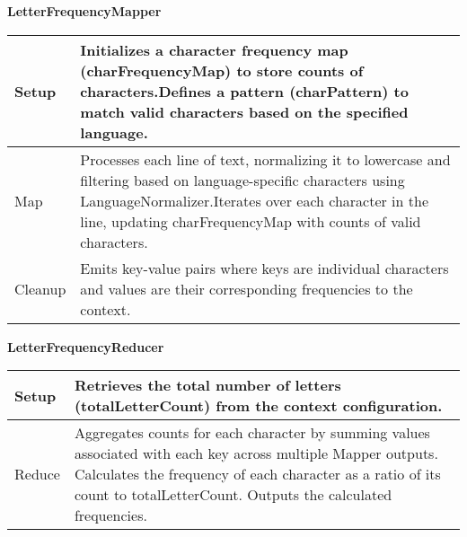 \textbf{LetterFrequencyMapper}
\begin{longtable}{|>{\raggedright\arraybackslash}p{}|>{\raggedright\arraybackslash}p{}|}
    \hline
    Setup & Initializes a character frequency map (charFrequencyMap) to store counts of characters.Defines a pattern (charPattern) to match valid characters based on the specified language. \\
    \hline
    Map & Processes each line of text, normalizing it to lowercase and filtering based on language-specific characters using LanguageNormalizer.Iterates over each character in the line, updating charFrequencyMap with counts of valid characters.\\
    \hline
    Cleanup & Emits key-value pairs where keys are individual characters and values are their corresponding frequencies to the context.
    \\
    \hline
\end{longtable}


\textbf{LetterFrequencyReducer}
\begin{longtable}{|>{\raggedright\arraybackslash}p{}|>{\raggedright\arraybackslash}p{}|}
    \hline
    Setup & Retrieves the total number of letters (totalLetterCount) from the context configuration. \\
    \hline
    Reduce & Aggregates counts for each character by summing values associated with each key across multiple Mapper outputs.
    Calculates the frequency of each character as a ratio of its count to totalLetterCount.
    Outputs the calculated frequencies.\\
    \hline
\end{longtable}

